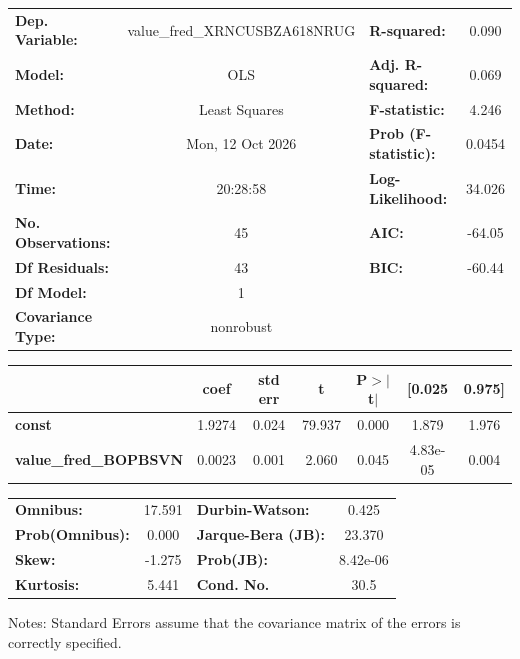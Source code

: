 \begin{center}
\begin{tabular}{lclc}
\toprule
\textbf{Dep. Variable:}       & value\_fred\_XRNCUSBZA618NRUG & \textbf{  R-squared:         } &     0.090   \\
\textbf{Model:}               &              OLS              & \textbf{  Adj. R-squared:    } &     0.069   \\
\textbf{Method:}              &         Least Squares         & \textbf{  F-statistic:       } &     4.246   \\
\textbf{Date:}                &        Mon, 12 Oct 2026       & \textbf{  Prob (F-statistic):} &   0.0454    \\
\textbf{Time:}                &            20:28:58           & \textbf{  Log-Likelihood:    } &    34.026   \\
\textbf{No. Observations:}    &                 45            & \textbf{  AIC:               } &    -64.05   \\
\textbf{Df Residuals:}        &                 43            & \textbf{  BIC:               } &    -60.44   \\
\textbf{Df Model:}            &                  1            & \textbf{                     } &             \\
\textbf{Covariance Type:}     &           nonrobust           & \textbf{                     } &             \\
\bottomrule
\end{tabular}
\begin{tabular}{lcccccc}
                              & \textbf{coef} & \textbf{std err} & \textbf{t} & \textbf{P$> |$t$|$} & \textbf{[0.025} & \textbf{0.975]}  \\
\midrule
\textbf{const}                &       1.9274  &        0.024     &    79.937  &         0.000        &        1.879    &        1.976     \\
\textbf{value\_fred\_BOPBSVN} &       0.0023  &        0.001     &     2.060  &         0.045        &     4.83e-05    &        0.004     \\
\bottomrule
\end{tabular}
\begin{tabular}{lclc}
\textbf{Omnibus:}       & 17.591 & \textbf{  Durbin-Watson:     } &    0.425  \\
\textbf{Prob(Omnibus):} &  0.000 & \textbf{  Jarque-Bera (JB):  } &   23.370  \\
\textbf{Skew:}          & -1.275 & \textbf{  Prob(JB):          } & 8.42e-06  \\
\textbf{Kurtosis:}      &  5.441 & \textbf{  Cond. No.          } &     30.5  \\
\bottomrule
\end{tabular}
\end{center}

Notes: \newline
 [1] Standard Errors assume that the covariance matrix of the errors is correctly specified.